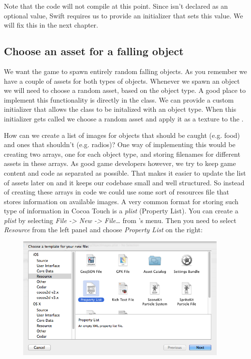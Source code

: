 Note that the code will not compile at this point. Since  isn't
declared as an optional value, Swift requires us to provide an initializer that
sets this value. We will fix this in the next chapter.

\subsection{Choose an asset for a falling object}
We want the game to spawn entirely random falling objects. As you remember we
have a couple of assets for both types of objects. Whenever we spawn an object
we will need to choose a random asset, based on the object type. A good place to
implement this functionality is directly in the 
class. We can provide a custom initializer that allows the class to be initalized with an object type.
When this initializer gets called we choose a random asset and apply it as a
texture to the .

How can we create a list of images for objects that should be caught (e.g.
food) and ones that shouldn't (e.g. radios)? One way of implementing this would
be creating two arrays, one for each object type, and storing filenames for 
different assets in these arrays. As good game developers however, we try to
keep game content and code as separated as possible. That makes it easier to
update the list of assets later on and it keeps our codebase small and well
structured. So instead of creating these arrays in code we could use some sort
of resources file that stores information on available images. A very common 
format for storing such type of information in Cocoa Touch is a \textit{plist} 
(Property List). You can create a \textit{plist} by selecting \textit{File ->
New -> File\ldots} from \xcode{}'s menu. 
Then you need to select \textit{Resource} from the left panel and choose
\textit{Property List} on the right:

\begin{figure}[H]
		\centering
		\includegraphics[width=300pt]{images/Chapter2/create_plist.png}
\end{figure}


